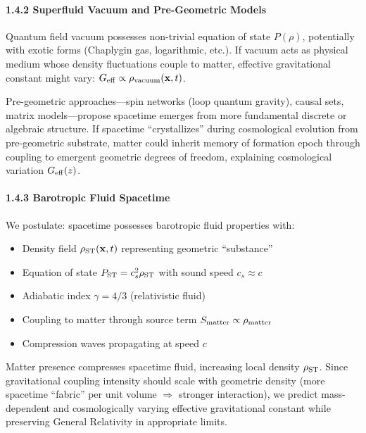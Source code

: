 \documentclass[11pt,a4paper]{article}
\providecommand{\tightlist}{\setlength{\itemsep}{0pt}\setlength{\parskip}{0pt}}
\begin{document}
\hypertarget{superfluid-vacuum-and-pre-geometric-models}{%
\paragraph{1.4.2 Superfluid Vacuum and Pre-Geometric
Models}\label{superfluid-vacuum-and-pre-geometric-models}}

Quantum field vacuum possesses non-trivial equation of state
\(P(\rho)\), potentially with exotic forms (Chaplygin gas, logarithmic,
etc.). If vacuum acts as physical medium whose density fluctuations
couple to matter, effective gravitational constant might vary:
\(G_{\rm eff} \propto \rho_{\rm vacuum}({\bf x},t)\).

Pre-geometric approaches---spin networks (loop quantum gravity), causal
sets, matrix models---propose spacetime emerges from more fundamental
discrete or algebraic structure. If spacetime ``crystallizes'' during
cosmological evolution from pre-geometric substrate, matter could
inherit memory of formation epoch through coupling to emergent geometric
degrees of freedom, explaining cosmological variation
\(G_{\rm eff}(z)\).

\hypertarget{barotropic-fluid-spacetime}{%
\paragraph{1.4.3 Barotropic Fluid
Spacetime}\label{barotropic-fluid-spacetime}}

We postulate: spacetime possesses barotropic fluid properties with:

\begin{itemize}
\tightlist
\item
  Density field \(\rho_{\rm ST}({\bf x},t)\) representing geometric
  ``substance''
\item
  Equation of state \(P_{\rm ST} = c_s^2 \rho_{\rm ST}\) with sound
  speed \(c_s \approx c\)
\item
  Adiabatic index \(\gamma = 4/3\) (relativistic fluid)
\item
  Coupling to matter through source term
  \(S_{\rm matter} \propto \rho_{\rm matter}\)
\item
  Compression waves propagating at speed \(c\)
\end{itemize}

Matter presence compresses spacetime fluid, increasing local density
\(\rho_{\rm ST}\). Since gravitational coupling intensity should scale
with geometric density (more spacetime ``fabric'' per unit volume
\(\Rightarrow\) stronger interaction), we predict mass-dependent and
cosmologically varying effective gravitational constant while preserving
General Relativity in appropriate limits.
\end{document}
